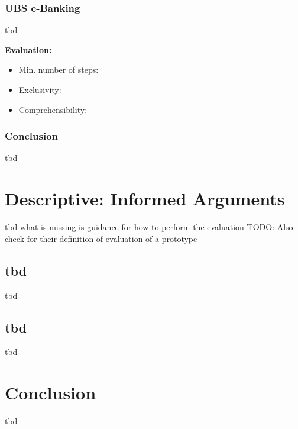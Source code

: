 
\subsubsection{UBS e-Banking}

tbd

\textbf{Evaluation:} 
\begin{itemize}[noitemsep,nolistsep]
	\item Min. number of steps: \textbf{}
	\item Exclusivity: \textbf{}
	\item Comprehensibility: \textbf{}
\end{itemize}


\subsubsection{Conclusion}

tbd





\section{Descriptive: Informed Arguments}

tbd
what is missing is guidance for how to perform the evaluation
TODO: Also check \cite{Peffers2012} for their definition of evaluation of a prototype


\subsection{tbd}

tbd





\subsection{tbd}

tbd





\section{Conclusion}

tbd





